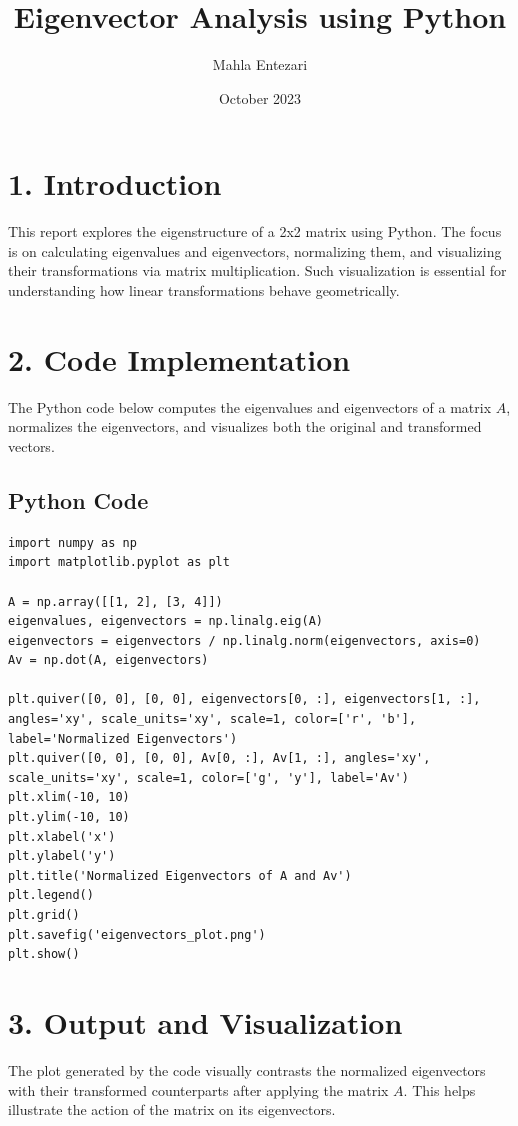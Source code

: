 \documentclass{article}
\title{Eigenvector Analysis using Python}
\author{Mahla Entezari}
\date{October 2023}
\begin{document}
\maketitle

\section*{1. Introduction}
This report explores the eigenstructure of a 2x2 matrix using Python. The focus is on calculating eigenvalues and eigenvectors, normalizing them, and visualizing their transformations via matrix multiplication. Such visualization is essential for understanding how linear transformations behave geometrically.

\section*{2. Code Implementation}
The Python code below computes the eigenvalues and eigenvectors of a matrix $A$, normalizes the eigenvectors, and visualizes both the original and transformed vectors.

\subsection*{Python Code}
\begin{lstlisting}
import numpy as np
import matplotlib.pyplot as plt

A = np.array([[1, 2], [3, 4]])
eigenvalues, eigenvectors = np.linalg.eig(A)
eigenvectors = eigenvectors / np.linalg.norm(eigenvectors, axis=0)
Av = np.dot(A, eigenvectors)

plt.quiver([0, 0], [0, 0], eigenvectors[0, :], eigenvectors[1, :], angles='xy', scale_units='xy', scale=1, color=['r', 'b'], label='Normalized Eigenvectors')
plt.quiver([0, 0], [0, 0], Av[0, :], Av[1, :], angles='xy', scale_units='xy', scale=1, color=['g', 'y'], label='Av')
plt.xlim(-10, 10)
plt.ylim(-10, 10)
plt.xlabel('x')
plt.ylabel('y')
plt.title('Normalized Eigenvectors of A and Av')
plt.legend()
plt.grid()
plt.savefig('eigenvectors_plot.png')
plt.show()
\end{lstlisting}

\section*{3. Output and Visualization}
The plot generated by the code visually contrasts the normalized eigenvectors with their transformed counterparts after applying the matrix $A$. This helps illustrate the action of the matrix on its eigenvectors.
\end{document}
